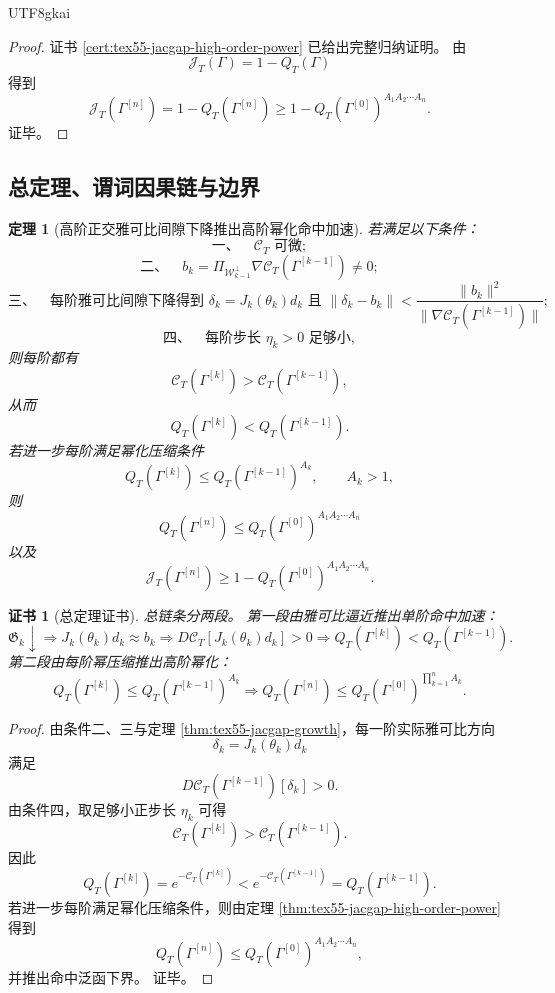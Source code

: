 \documentclass[12pt]{article}
\newtheorem{theorem}{定理}[section]
\newtheorem{Certificate}{证书}[section]
\begin{document}
\begin{CJK*}{UTF8}{gkai}
\begin{proof}
证书 \ref{cert:tex55-jacgap-high-order-power} 已给出完整归纳证明。
由
\[
  \mathcal J_T(\Gamma)=1-Q_T(\Gamma)
\]
得到
\[
  \mathcal J_T(\Gamma^{[n]})
  =
  1-Q_T(\Gamma^{[n]})
  \ge
  1-Q_T(\Gamma^{[0]})^{A_1A_2\cdots A_n}.
\]
证毕。
\end{proof}

\subsection{总定理、谓词因果链与边界}
\label{subsec:tex55-jacgap-total-chain-boundary}

\begin{theorem}[高阶正交雅可比间隙下降推出高阶幂化命中加速]
\label{thm:tex55-jacgap-total-theorem}
若满足以下条件：
\[
  \text{一、}\quad
  \mathcal C_T\text{ 可微};
\]
\[
  \text{二、}\quad
  b_k=
  \Pi_{\mathcal W_{k-1}^{\perp}}
  \nabla\mathcal C_T(\Gamma^{[k-1]})
  \neq0;
\]
\[
  \text{三、}\quad
  \text{每阶雅可比间隙下降得到 }
  \delta_k=J_k(\theta_k)d_k
  \text{ 且 }
  \lVert\delta_k-b_k\rVert
  <
  \frac{\lVert b_k\rVert^2}
  {\lVert\nabla\mathcal C_T(\Gamma^{[k-1]})\rVert};
\]
\[
  \text{四、}\quad
  \text{每阶步长 }\eta_k>0\text{ 足够小},
\]
则每阶都有
\[
  \mathcal C_T(\Gamma^{[k]})
  >
  \mathcal C_T(\Gamma^{[k-1]}),
\]
从而
\[
  Q_T(\Gamma^{[k]})
  <
  Q_T(\Gamma^{[k-1]}).
\]
若进一步每阶满足幂化压缩条件
\[
  Q_T(\Gamma^{[k]})
  \le
  Q_T(\Gamma^{[k-1]})^{A_k},
  \qquad
  A_k>1,
\]
则
\[
  \boxed{
  Q_T(\Gamma^{[n]})
  \le
  Q_T(\Gamma^{[0]})^{A_1A_2\cdots A_n}
  }
\]
以及
\[
  \boxed{
  \mathcal J_T(\Gamma^{[n]})
  \ge
  1-
  Q_T(\Gamma^{[0]})^{A_1A_2\cdots A_n}.
  }
\]
\end{theorem}

\begin{Certificate}[总定理证书]
\label{cert:tex55-jacgap-total-theorem}
总链条分两段。
第一段由雅可比逼近推出单阶命中加速：
\[
  \mathfrak G_k\downarrow
  \Longrightarrow
  J_k(\theta_k)d_k\approx b_k
  \Longrightarrow
  D\mathcal C_T[J_k(\theta_k)d_k]>0
  \Longrightarrow
  Q_T(\Gamma^{[k]})<Q_T(\Gamma^{[k-1]}).
\]
第二段由每阶幂压缩推出高阶幂化：
\[
  Q_T(\Gamma^{[k]})
  \le
  Q_T(\Gamma^{[k-1]})^{A_k}
  \Longrightarrow
  Q_T(\Gamma^{[n]})
  \le
  Q_T(\Gamma^{[0]})^{\prod_{k=1}^{n}A_k}.
\]
\end{Certificate}

\begin{proof}
由条件二、三与定理 \ref{thm:tex55-jacgap-growth}，每一阶实际雅可比方向
\[
  \delta_k=J_k(\theta_k)d_k
\]
满足
\[
  D\mathcal C_T(\Gamma^{[k-1]})[\delta_k]>0.
\]
由条件四，取足够小正步长 \(\eta_k\) 可得
\[
  \mathcal C_T(\Gamma^{[k]})
  >
  \mathcal C_T(\Gamma^{[k-1]}).
\]
因此
\[
  Q_T(\Gamma^{[k]})
  =
  e^{-\mathcal C_T(\Gamma^{[k]})}
  <
  e^{-\mathcal C_T(\Gamma^{[k-1]})}
  =
  Q_T(\Gamma^{[k-1]}).
\]
若进一步每阶满足幂化压缩条件，则由定理
\ref{thm:tex55-jacgap-high-order-power} 得到
\[
  Q_T(\Gamma^{[n]})
  \le
  Q_T(\Gamma^{[0]})^{A_1A_2\cdots A_n},
\]
并推出命中泛函下界。
证毕。
\end{proof}


\end{CJK*}
\end{document}
